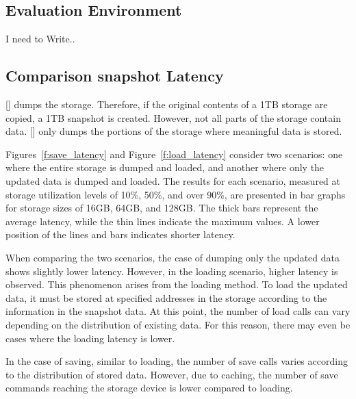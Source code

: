 


\subsection{Evaluation Environment}

I need to Write..


\subsection{Comparison snapshot Latency}
[] dumps the storage.
Therefore, if the original contents of a 1TB storage are copied, a 1TB snapshot is created.
However, not all parts of the storage contain data.
[] only dumps the portions of the storage where meaningful data is stored.

Figures~\ref{f:save_latency} and Figure~\ref{f:load_latency} consider two scenarios: one where the entire storage is dumped and loaded, and another where only the updated data is dumped and loaded.
The results for each scenario, measured at storage utilization levels of 10\%, 50\%, and over 90\%, are presented in bar graphs for storage sizes of 16GB, 64GB, and 128GB.
The thick bars represent the average latency, while the thin lines indicate the maximum values.
A lower position of the lines and bars indicates shorter latency.

When comparing the two scenarios, the case of dumping only the updated data shows slightly lower latency.
However, in the loading scenario, higher latency is observed. This phenomenon arises from the loading method.
To load the updated data, it must be stored at specified addresses in the storage according to the information in the snapshot data.
At this point, the number of load calls can vary depending on the distribution of existing data.
For this reason, there may even be cases where the loading latency is lower.

In the case of saving, similar to loading, the number of save calls varies according to the distribution of stored data.
However, due to caching, the number of save commands reaching the storage device is lower compared to loading.

